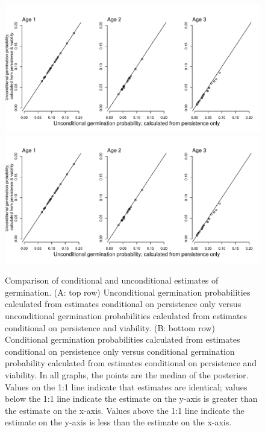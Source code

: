 \documentclass[12pt, oneside]{article}   	%
\begin{document}
 \begin{figure}[!h]
        \centering
        \includegraphics[page=1,width=\textwidth]{../../figures/compare-structured-germination.pdf} 
        \includegraphics[page=2,width=\textwidth]{../../figures/compare-structured-germination.pdf} 
            \caption{ Comparison of conditional and unconditional estimates of germination. (A: top row) Unconditional germination probabilities calculated from estimates conditional on persistence only versus unconditional germination probabilities calculated from estimates conditional on persistence and viability. (B: bottom row) Conditional germination probabilities calculated from estimates conditional on persistence only versus conditional germination probability calculated from estimates conditional on persistence and viability. In all graphs, the points are the median of the posterior. Values on the 1:1 line indicate that estimates are identical; values below the 1:1 line indicate the estimate on the y-axis is greater than the estimate on the x-axis. Values above the 1:1 line indicate the estimate on the y-axis is less than the estimate on the x-axis. }
 \label{fig:germination-estimates-population}
\end{figure}
\end{document}
